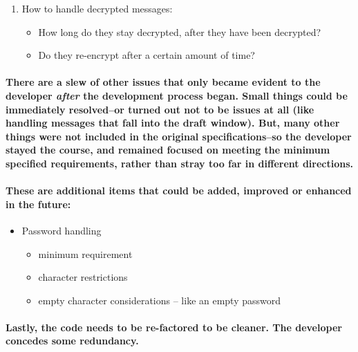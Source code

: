 \begin{enumerate}
\item How to handle decrypted messages:
\begin{itemize}
\item How long do they stay decrypted, after they have been decrypted?
\item Do they re-encrypt after a certain amount of time?
\end{itemize}
\end{enumerate}

\paragraph{There are a slew of other issues that only became evident to the developer \emph{after} the development process began. Small things could be immediately resolved--or turned out not to be issues at all (like handling messages that fall into the draft window). But, many other things were not included in the original specifications--so the developer stayed the course, and remained focused on meeting the minimum specified requirements, rather than stray too far in different directions.}


\paragraph{These are additional items that could be added, improved or enhanced in the future:}

\begin{itemize}
\item Password handling
\begin{itemize}
\item minimum requirement
\item character restrictions
\item empty character considerations -- like an empty password
\end{itemize}
\end{itemize}

\paragraph{Lastly, the code needs to be re-factored to be cleaner. The developer concedes some redundancy.}